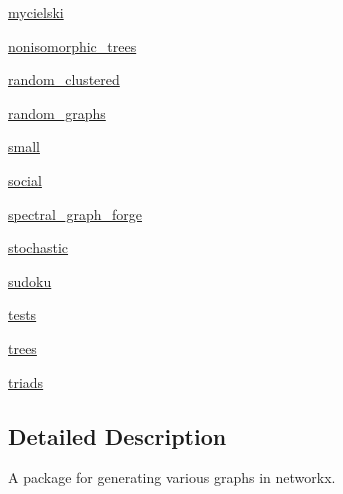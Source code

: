 \begin{DoxyCompactItemize}
\item 
 \hyperlink{namespacenetworkx_1_1generators_1_1mycielski}{mycielski}
\item 
 \hyperlink{namespacenetworkx_1_1generators_1_1nonisomorphic__trees}{nonisomorphic\+\_\+trees}
\item 
 \hyperlink{namespacenetworkx_1_1generators_1_1random__clustered}{random\+\_\+clustered}
\item 
 \hyperlink{namespacenetworkx_1_1generators_1_1random__graphs}{random\+\_\+graphs}
\item 
 \hyperlink{namespacenetworkx_1_1generators_1_1small}{small}
\item 
 \hyperlink{namespacenetworkx_1_1generators_1_1social}{social}
\item 
 \hyperlink{namespacenetworkx_1_1generators_1_1spectral__graph__forge}{spectral\+\_\+graph\+\_\+forge}
\item 
 \hyperlink{namespacenetworkx_1_1generators_1_1stochastic}{stochastic}
\item 
 \hyperlink{namespacenetworkx_1_1generators_1_1sudoku}{sudoku}
\item 
 \hyperlink{namespacenetworkx_1_1generators_1_1tests}{tests}
\item 
 \hyperlink{namespacenetworkx_1_1generators_1_1trees}{trees}
\item 
 \hyperlink{namespacenetworkx_1_1generators_1_1triads}{triads}
\end{DoxyCompactItemize}


\subsection{Detailed Description}
\begin{DoxyVerb}A package for generating various graphs in networkx.\end{DoxyVerb}
 